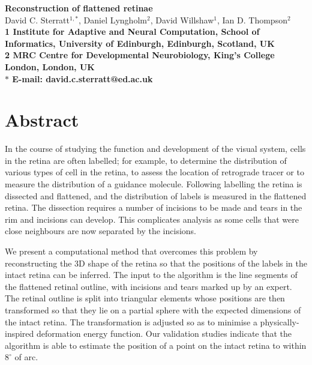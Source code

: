 \documentclass[10pt]{article}
\date{}
\begin{document}
\begin{flushleft}
{\Large
\textbf{Reconstruction of flattened retinae}
}
\\
David C. Sterratt$^{1,\ast}$, Daniel Lyngholm$^{2}$, David
Willshaw$^{1}$, Ian D. Thompson$^{2}$
\\
\bf{1} Institute for Adaptive and Neural Computation, School of
Informatics, University of Edinburgh, Edinburgh, Scotland, UK
\\
\bf{2} MRC Centre for Developmental Neurobiology, King's College
London, London, UK
\\
$\ast$ E-mail: david.c.sterratt@ed.ac.uk
\end{flushleft}

\todolist

\section*{Abstract}




In the course of studying the function and development of the visual
system, cells in the retina are often labelled; for example, to
determine the distribution of various types of cell in the retina, to
assess the location of retrograde tracer or to measure the
distribution of a guidance molecule.  Following labelling the retina
is dissected and flattened, and the distribution of labels is measured
in the flattened retina.  The dissection requires a number of
incisions to be made and tears in the rim and incisions can
develop. This complicates analysis as some cells that were close
neighbours are now separated by the incisions.

We present a computational method that overcomes this problem by
reconstructing the 3D shape of the retina so that the positions of the
labels in the intact retina can be inferred. The input to the
algorithm is the line segments of the flattened retinal outline, with
incisions and tears marked up by an expert. The retinal outline is
split into triangular elements whose positions are then transformed so
that they lie on a partial sphere with the expected dimensions of the
intact retina.  The transformation is adjusted so as to minimise a
physically-inspired deformation energy function. Our validation
studies indicate that the algorithm is able to estimate the position
of a point on the intact retina to within $8^\circ$ of arc.
\end{document}
